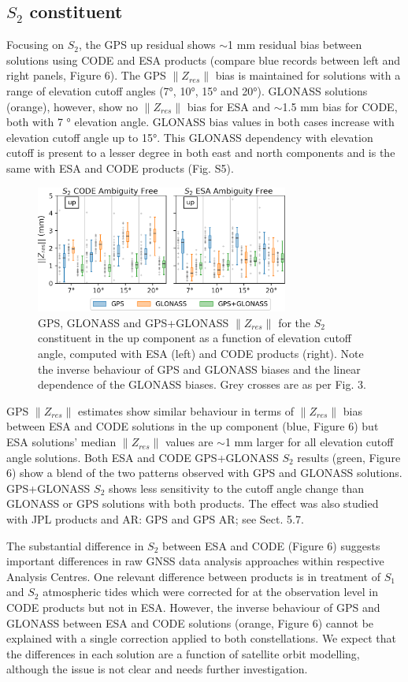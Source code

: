 \documentclass[se, manuscript]{copernicus}
\begin{document}
\subsection{$S_2$ constituent}
Focusing on $S_2$, the GPS up residual shows $\sim$1 mm residual bias between solutions using CODE and ESA products (compare blue records between left and right panels, Figure 6). The GPS $\|Z_{res}\|$ bias is maintained for solutions with a range of elevation cutoff angles (7°, 10°, 15° and 20°). GLONASS solutions (orange), however, show no $\|Z_{res}\|$ bias for ESA and $\sim$1.5 mm bias for CODE, both with 7 ° elevation angle. GLONASS bias values in both cases increase with elevation cutoff angle up to 15°. This GLONASS dependency with elevation cutoff is present to a lesser degree in both east and north components and is the same with ESA and CODE products (Fig. S5).

\begin{figure}[t]
\includegraphics[width=8.3cm]{fig06.png}
\caption{GPS, GLONASS and GPS+GLONASS $\|Z_{res}\|$ for the $S_2$ constituent in the up component as a function of elevation cutoff angle, computed with ESA (left) and CODE products (right). Note the inverse behaviour of GPS and GLONASS biases and the linear dependence of the GLONASS biases. Grey crosses are as per Fig. 3.}
\end{figure}

GPS $\|Z_{res}\|$ estimates show similar behaviour in terms of $\|Z_{res}\|$ bias between ESA and CODE solutions in the up component (blue, Figure 6) but ESA solutions' median $\|Z_{res}\|$ values are $\sim$1 mm larger for all elevation cutoff angle solutions.
Both ESA and CODE GPS+GLONASS $S_2$ results (green, Figure 6) show a blend of the two patterns observed with GPS and GLONASS solutions. GPS+GLONASS $S_2$ shows less sensitivity to the cutoff angle change than GLONASS or GPS solutions with both products. The effect was also studied with JPL products and AR: GPS and GPS AR; see Sect. 5.7.

The substantial difference in $S_2$ between ESA and CODE (Figure 6) suggests important differences in raw GNSS data analysis approaches within respective Analysis Centres. One relevant difference between products is in treatment of $S_1$ and $S_2$ atmospheric tides which were corrected for at the observation level in CODE products but not in ESA. However, the inverse behaviour of GPS and GLONASS between ESA and CODE solutions (orange, Figure 6) cannot be explained with a single correction applied to both constellations. We expect that the differences in each solution are a function of satellite orbit modelling, although the issue is not clear and needs further investigation.
\end{document}
